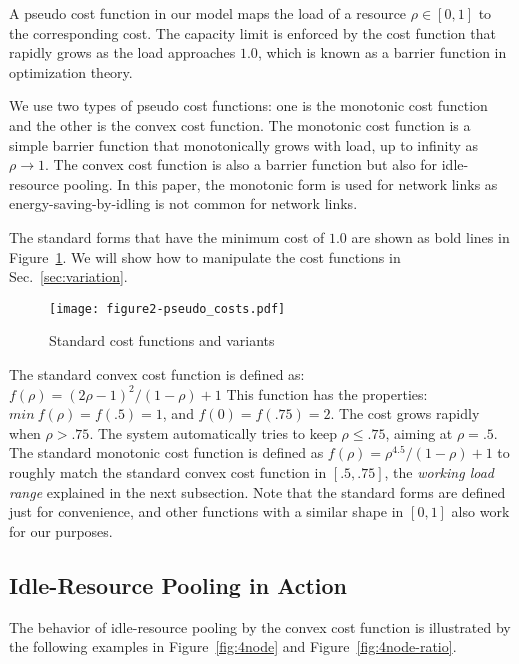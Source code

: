 A pseudo cost function in our model maps the load of a resource
$\rho \in [0, 1]$ to the corresponding cost.
The capacity limit is enforced by the cost function that rapidly grows
as the load approaches $1.0$, which is known as a barrier function in
optimization theory.

We use two types of pseudo cost functions: one is the monotonic cost
function and the other is the convex cost function.
The monotonic cost function is a simple barrier function that
monotonically grows with load, up to infinity as $\rho \to 1$.
The convex cost function is also a barrier function but also for
idle-resource pooling.
In this paper, the monotonic form is used for network links as
energy-saving-by-idling is not common for network links.

The standard forms that have the minimum cost of $1.0$ are
shown as bold lines in Figure~\ref{fig:std_costfunc}. We will show how
to manipulate the cost functions in Sec.~\ref{sec:variation}.

\begin{figure}[tb]
  \begin{center}
    \texttt{[image: figure2-pseudo\_costs.pdf]}
    \vspace{-2.0ex}
    \caption{Standard cost functions and variants}
    \label{fig:std_costfunc}
  \end{center}
\end{figure}

The standard convex cost function is defined as:
\(f(\rho) = (2\rho - 1)^{2}/(1 - \rho) + 1\)
This function has the properties:
$min\: f(\rho) = f(.5) = 1$, and $f(0) = f(.75) = 2$.
The cost grows rapidly when $\rho > .75$.
The system automatically tries to keep $\rho \le .75$,
aiming at $\rho = .5$.
The standard monotonic cost function is defined as
\( f(\rho) = \rho^{4.5}/(1 - \rho) + 1\)
to roughly match the standard convex cost function in $[.5, .75]$,
the {\em working load range} explained in the next subsection.
Note that the standard forms are defined just for convenience, and
other functions with a similar shape in $[0,1]$ also work for our
purposes.

\subsection{Idle-Resource Pooling in Action}

The behavior of idle-resource pooling by the convex cost function is
illustrated by the following examples in Figure~\ref{fig:4node} and
Figure~\ref{fig:4node-ratio}.

